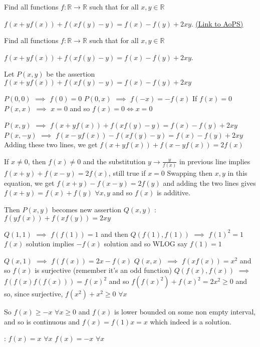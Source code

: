 \begin{problem}
	Find all functions $f:\mathbb R\longrightarrow \mathbb R$ such that for all $x,y\in \mathbb R$

$f(x+yf(x))+f(xf(y)-y)=f(x)-f(y)+2xy$.
	\flushright \href{https://artofproblemsolving.com/community/c6h474474}{(Link to AoPS)}
\end{problem}



\begin{solution}
	\begin{tcolorbox}Find all functions $f:\mathbb R\longrightarrow \mathbb R$ such that for all $x,y\in \mathbb R$

$f(x+yf(x))+f(xf(y)-y)=f(x)-f(y)+2xy$.\end{tcolorbox}
Let $P(x,y)$ be the assertion $f(x+yf(x))+f(xf(y)-y)=f(x)-f(y)+2xy$

$P(0,0)$ $\implies$ $f(0)=0$
$P(0,x)$ $\implies$ $f(-x)=-f(x)$
If $f(x)=0$ $P(x,x)$ $\implies$ $x=0$ and so $f(x)=0\iff x=0$


$P(x,y)$ $\implies$ $f(x+yf(x))+f(xf(y)-y)=f(x)-f(y)+2xy$
$P(x,-y)$ $\implies$ $f(x-yf(x))-f(xf(y)-y)=f(x)-f(y)+2xy$
Adding these two lines, we get $f(x+yf(x))+f(x-yf(x))=2f(x)$

If $x\ne 0$, then $f(x)\ne 0$ and the substitution $y\to\frac y{f(x)}$ in previous line implies $f(x+y)+f(x-y)=2f(x)$, still true if $x=0$
Swapping then $x,y$ in this equation, we get $f(x+y)-f(x-y)=2f(y)$ and adding the two lines gives $f(x+y)=f(x)+f(y)$ $\forall x,y$ and so $f(x)$ is additive.

Then $P(x,y)$ becomes new assertion $Q(x,y)$ : $f(yf(x))+f(xf(y))=2xy$

$Q(1,1)$ $\implies$ $f(f(1))=1$ and then $Q(f(1),f(1))$ $\implies$ $f(1)^2=1$
$f(x)$ solution implies $-f(x)$ solution and so WLOG say $f(1)=1$

$Q(x,1)$ $\implies$ $f(f(x))=2x-f(x)$
$Q(x,x)$ $\implies$ $f(xf(x))=x^2$ and so $f(x)$ is surjective (remember it's an odd function)
$Q(f(x),f(x))$ $\implies$ $f(f(x)f(f(x)))=f(x)^2$ and so $f(f(x)^2)+f(x)^2=2x^2\ge 0$ and so, since surjective, $f(x^2)+x^2\ge 0$ $\forall x$

So $f(x)\ge -x$ $\forall x\ge 0$ and $f(x)$ is lower bounded on some non empty interval, and so is continuous and $f(x)=f(1)x=x$ which indeed is a solution.

 :
$f(x)=x$ $\forall x$
$f(x)=-x$ $\forall x$
\end{solution}



